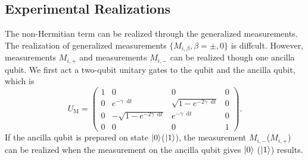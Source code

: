 \documentclass[longbibliography, aps, prx, amsmath, amssymb, amsfonts, twocolumn,superscriptaddress, footinbib]{revtex4-1}
\newcommand{\dif}{\mathop{}\!\mathrm{d}}
\begin{document}

	\subsection{Experimental Realizations}
	The non-Hermitian term can be realized through the generalized measurements. The realization of generalized measurements $\{M_{i,\beta}, \beta=\pm,0\}$ is diffcult. However, measurements $M_{i,+}$ and measurements $M_{i,-}$ can be realized though one ancilla qubit. We first act a two-qubit unitary gates to the qubit and the ancilla qubit, which is
	\begin{equation}
		U_{\text{M}} = \begin{pmatrix}
		  1 & 0 & 0 & 0\\
		  0 & e^{-\gamma \dif t} & \sqrt{1-e^{-2 \gamma \dif t}} & 0\\
		  0 & -\sqrt{1-e^{-2 \gamma \dif t}} & e^{-\gamma \dif t} & 0\\
		  0 & 0 & 0 & 1
		\end{pmatrix}.
	\end{equation}
	If the ancilla qubit is prepared on state $\ket{0}$($\ket{1}$), the measurement $M_{i,-}$($M_{i,+}$) can be realized when the measurement on the ancilla qubit gives $\ket{0}$ ($\ket{1}$) results. 
\end{document}
